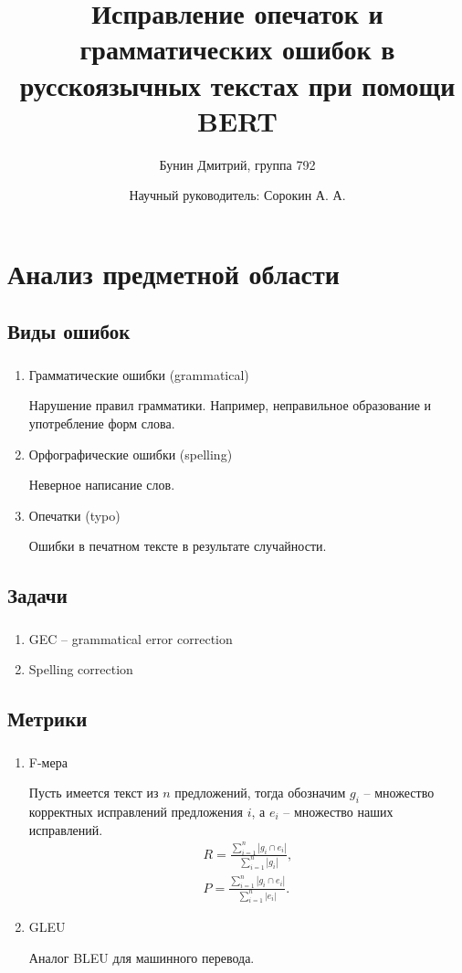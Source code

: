 \documentclass[t]{beamer}  %
\title{Исправление опечаток и грамматических ошибок в русскоязычных текстах при помощи BERT}
\author{Бунин Дмитрий, группа 792}
\date{Научный руководитель: Сорокин А. А.}
\begin{document}
\frame[plain]{\titlepage}	%

\section{Анализ предметной области}
\subsection{Виды ошибок}
 
\begin{frame}
	\frametitle{\insertsection} 
	\framesubtitle{\insertsubsection}
	\begin{enumerate}
		\item Грамматические ошибки (grammatical)
		
		Нарушение правил грамматики. Например, неправильное образование и употребление форм слова.
		
		\item Орфографические ошибки (spelling)
		
		Неверное написание слов.
		
		\item Опечатки (typo)
		
		Ошибки в печатном тексте в результате случайности.
		
	\end{enumerate}
\end{frame}

\subsection{Задачи}
\begin{frame}
	\frametitle{\insertsection} 
	\framesubtitle{\insertsubsection}
	\begin{enumerate}
		\item GEC -- grammatical error correction
		\item Spelling correction
	\end{enumerate}
\end{frame}

\subsection{Метрики}
\begin{frame}
	\frametitle{\insertsection} 
	\framesubtitle{\insertsubsection}
	\begin{enumerate}
		\item F-мера
		
		Пусть имеется текст из $n$ предложений, тогда обозначим $g_i$ -- множество корректных исправлений предложения $i$, а $e_i$ -- множество наших исправлений. 
		\begin{gather*}
			R = \frac{\sum_{i=1}^n |g_i \cap e_i|}{\sum_{i=1}^n |g_i|},
			\\
			P = \frac{\sum_{i=1}^n |g_i \cap e_i|}{\sum_{i=1}^n |e_i|}.
		\end{gather*}
		\item GLEU
		
		Аналог BLEU для машинного перевода.
	\end{enumerate}
\end{frame}
\end{document}

